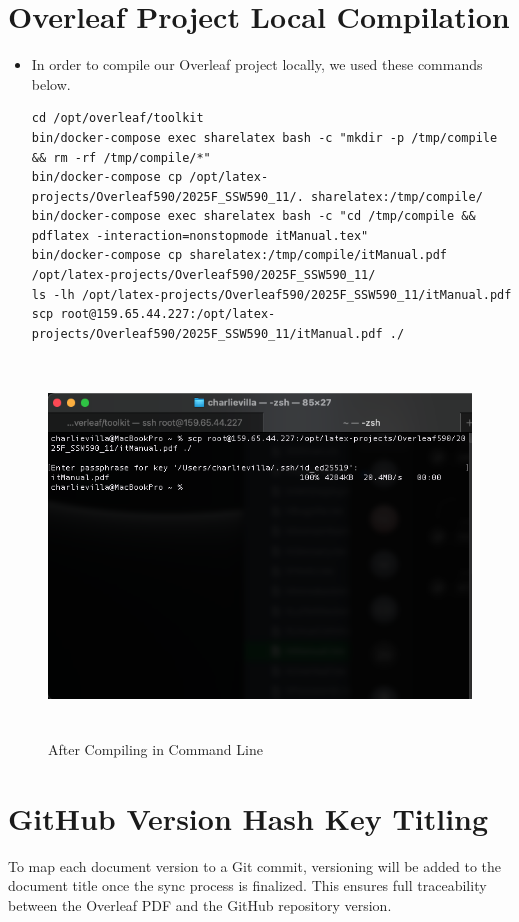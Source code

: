 \section{Overleaf Project Local Compilation}
\begin{itemize}
    \item In order to compile our Overleaf project locally, we used these commands below.
\begin{verbatim}
cd /opt/overleaf/toolkit
bin/docker-compose exec sharelatex bash -c "mkdir -p /tmp/compile && rm -rf /tmp/compile/*"
bin/docker-compose cp /opt/latex-projects/Overleaf590/2025F_SSW590_11/. sharelatex:/tmp/compile/
bin/docker-compose exec sharelatex bash -c "cd /tmp/compile && pdflatex -interaction=nonstopmode itManual.tex"
bin/docker-compose cp sharelatex:/tmp/compile/itManual.pdf /opt/latex-projects/Overleaf590/2025F_SSW590_11/
ls -lh /opt/latex-projects/Overleaf590/2025F_SSW590_11/itManual.pdf
scp root@159.65.44.227:/opt/latex-projects/Overleaf590/2025F_SSW590_11/itManual.pdf ./
\end{verbatim}
\end{itemize}

\begin{figure}[htp]
    \centering
    \includegraphics[width=15cm, height=10cm]{png/DomainNames/CL Compiling Pic.png}
    \caption{After Compiling in Command Line}
    \label{fig:DomainNames}
\end{figure}

\section{GitHub Version Hash Key Titling}
To map each document version to a Git commit, versioning will be added to the document title once the sync process is finalized. This ensures full traceability between the Overleaf PDF and the GitHub repository version.

